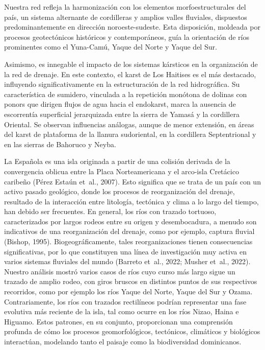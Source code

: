 \documentclass[spanish]{article}
\begin{document}
Nuestra red refleja la harmonización con los elementos
morfoestructurales del país, un sistema alternante de cordilleras y
amplios valles fluviales, dispuestos predominantemente en dirección
noroeste-sudeste. Esta disposición, moldeada por procesos geotectónicos
históricos y contemporáneos, guía la orientación de ríos prominentes
como el Yuna-Camú, Yaque del Norte y Yaque del Sur.

Asimismo, es innegable el impacto de los sistemas kársticos en la
organización de la red de drenaje. En este contexto, el karst de Los
Haitises es el más destacado, influyendo significativamente en la
estructuración de la red hidrográfica. Su característica de sumidero,
vinculada a la repetición monótona de dolinas con ponors que dirigen
flujos de agua hacia el endokarst, marca la ausencia de escorrentía
superficial jerarquizada entre la sierra de Yamasá y la cordillera
Oriental. Se observan influencias análogas, aunque de menor extensión,
en áreas del karst de plataforma de la llanura sudoriental, en la
cordillera Septentrional y en las sierras de Bahoruco y Neyba.

La Española es una isla originada a partir de una colisión derivada de
la convergencia oblicua entre la Placa Norteamericana y el arco-isla
Cretácico caribeño (Pérez Estaún et~al., 2007). Esto significa que se
trata de un país con un activo pasado geológico, donde los procesos de
reorganización del drenaje, resultado de la interacción entre litología,
tectónica y clima a lo largo del tiempo, han debido ser frecuentes. En
general, los ríos con trazado tortuoso, caracterizados por largos rodeos
entre su origen y desembocadura, a menudo son indicativos de una
reorganización del drenaje, como por ejemplo, captura fluvial (Bishop,
1995). Biogeográficamente, tales reorganizaciones tienen consecuencias
significativas, por lo que constituyen una línea de investigación muy
activa en varios sistemas fluviales del mundo (Barreto et~al., 2022;
Musher et~al., 2022). Nuestro análisis mostró varios casos de ríos cuyo
curso más largo sigue un trazado de amplio rodeo, con giros bruscos en
distintos puntos de sus respectivos recorridos, como por ejemplo los
ríos Yaque del Norte, Yaque del Sur y Ozama. Contrariamente, los ríos
con trazados rectilíneos podrían representar una fase evolutiva más
reciente de la isla, tal como ocurre en los ríos Nizao, Haina e Higuamo.
Estos patrones, en su conjunto, proporcionan una comprensión profunda de
cómo los procesos geomorfológicos, tectónicos, climáticos y biológicos
interactúan, modelando tanto el paisaje como la biodiversidad
dominicanos.
\end{document}
